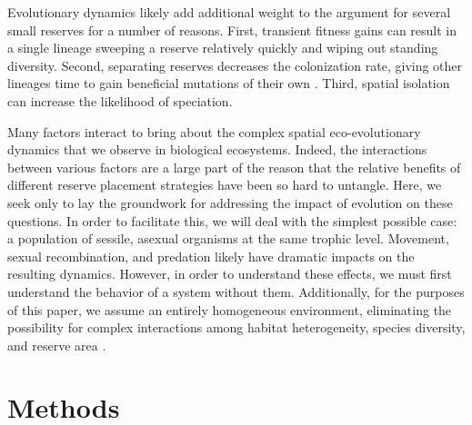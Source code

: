 \documentclass[letterpaper]{article}
\begin{document}
	Evolutionary dynamics likely add additional weight to the argument for several small reserves for a number of reasons. First, transient fitness gains can result in a single lineage sweeping a reserve relatively quickly and wiping out standing diversity. Second, separating reserves decreases the colonization rate, giving other lineages time to gain beneficial mutations of their own \citep{whitley_island_1998,tomassini_spatially_2005}. Third, spatial isolation can increase the likelihood of speciation.
%
%
%
%
%
%
%

	Many factors interact to bring about the complex spatial eco-evolutionary dynamics that we observe in biological ecosystems. Indeed, the interactions between various factors are a large part of the reason that the relative benefits of different reserve placement strategies have been so hard to untangle. Here, we seek only to lay the groundwork for addressing the impact of evolution on these questions. In order to facilitate this, we will deal with the simplest possible case: a population of sessile, asexual organisms at the same trophic level. Movement, sexual recombination, and predation likely have dramatic impacts on the resulting dynamics. However, in order to understand these effects, we must first understand the behavior of a system without them. Additionally, for the purposes of this paper, we assume an entirely homogeneous environment, eliminating the possibility for complex interactions among habitat heterogeneity, species diversity, and reserve area \citep{kadmon_integrating_2007}.

\section{Methods}
\end{document}

